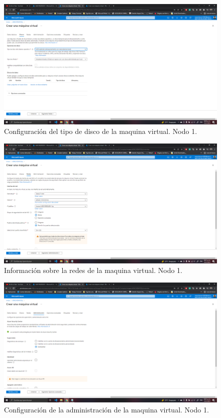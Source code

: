 \documentclass[11pt]{article}
\begin{document}
		\begin{figure}[H]
			\centering
			\includegraphics[scale=0.34]{resources/datosdisco1.png}
			\caption{Configuración del tipo de disco de la maquina virtual. Nodo 1.}\label{fig:picture}
		\end{figure}
		\begin{figure}[H]
			\centering
			\includegraphics[scale=0.34]{resources/datosredes1.png}
			\caption{Información sobre la redes de la maquina virtual. Nodo 1.}\label{fig:picture}
		\end{figure}
		\begin{figure}[H]
			\centering
			\includegraphics[scale=0.34]{resources/datosadministracion1.png}
			\caption{Configuración de la administración de la maquina virtual. Nodo 1.}\label{fig:picture}
		\end{figure}
\end{document}
